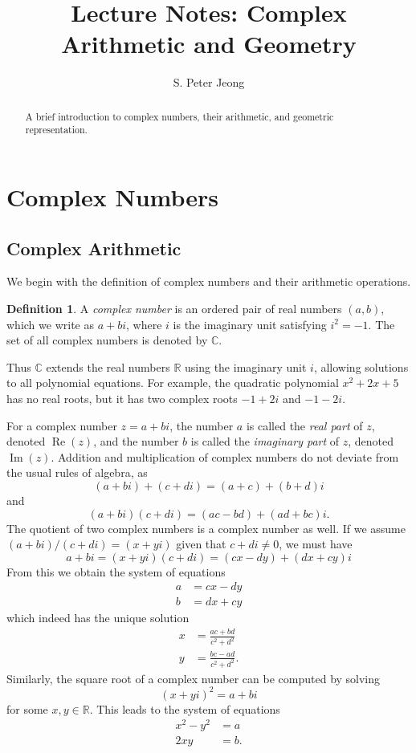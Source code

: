 \documentclass[11pt,oneside,reqno]{amsart}
\title{Lecture Notes: Complex Arithmetic and Geometry}
\author{S. Peter Jeong}
\newcommand\R{{\mathbb R}}
\newcommand\C{{\mathbb C}}
\numberwithin{equation}{section}
\theoremstyle{definition}
\newtheorem{definition}[theorem]{Definition}
\theoremstyle{remark}
\begin{document}
\begin{abstract}
    A brief introduction to complex numbers, their arithmetic, and geometric representation.
\end{abstract}
\maketitle

\section{Complex Numbers} 
\subsection{Complex Arithmetic}
We begin with the definition of complex numbers and their arithmetic operations.
\begin{definition}
    A \textit{complex number} is an ordered pair of real numbers $(a,b)$, which we write as $a + bi$, where $i$ is the imaginary unit satisfying $i^2 = -1$. The set of all complex numbers is denoted by $\C$.
\end{definition}
Thus $\C$ extends the real numbers $\R$ using the imaginary unit $i$, allowing solutions to all polynomial equations. For example, the quadratic polynomial $x^2+2x+5$ has no real roots, 
but it has two complex roots $-1 + 2i$ and $-1 - 2i$.

For a complex number $z = a + bi$, the number $a$ is called the \textit{real part} of $z$, denoted $\operatorname{Re}(z)$, 
and the number $b$ is called the \textit{imaginary part} of $z$, denoted $\operatorname{Im}(z)$. Addition and multiplication of complex numbers 
do not deviate from the usual rules of algebra, as 
\[(a + bi) + (c + di) = (a + c) + (b + d)i\] and 
\[(a + bi)(c + di) = (ac - bd) + (ad + bc)i.\]
The quotient of two complex numbers is a complex number as well. If we assume $(a+bi)/(c+di) = (x+yi)$ given that $c+di \neq 0$,
we must have 
\[a+bi = (x+yi)(c+di) = (cx - dy) + (dx + cy)i\]
From this we obtain the system of equations
\begin{align*}
    a &= cx - dy \\
    b &= dx + cy
\end{align*}
which indeed has the unique solution 
\begin{align*}
    x &= \frac{ac + bd}{c^2 + d^2} \\
    y &= \frac{bc - ad}{c^2 + d^2}.
\end{align*}
Similarly, the square root of a complex number can be computed by solving 
\[(x + yi)^2 = a + bi\]
for some $x,y \in \R$. This leads to the system of equations
\begin{align*}
    x^2 - y^2 &= a \\
    2xy &= b.
\end{align*}
\end{document}
